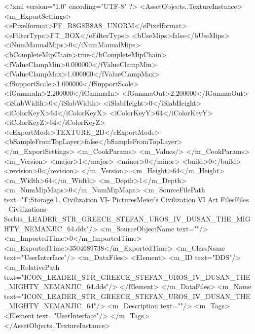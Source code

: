 <?xml version="1.0" encoding="UTF-8" ?>
<AssetObjects..TextureInstance>
	<m_ExportSettings>
		<ePixelformat>PF_R8G8B8A8_UNORM</ePixelformat>
		<eFilterType>FT_BOX</eFilterType>
		<bUseMips>false</bUseMips>
		<iNumManualMips>0</iNumManualMips>
		<bCompleteMipChain>true</bCompleteMipChain>
		<fValueClampMin>0.000000</fValueClampMin>
		<fValueClampMax>1.000000</fValueClampMax>
		<fSupportScale>1.000000</fSupportScale>
		<fGammaIn>2.200000</fGammaIn>
		<fGammaOut>2.200000</fGammaOut>
		<iSlabWidth>0</iSlabWidth>
		<iSlabHeight>0</iSlabHeight>
		<iColorKeyX>64</iColorKeyX>
		<iColorKeyY>64</iColorKeyY>
		<iColorKeyZ>64</iColorKeyZ>
		<eExportMode>TEXTURE_2D</eExportMode>
		<bSampleFromTopLayer>false</bSampleFromTopLayer>
	</m_ExportSettings>
	<m_CookParams>
		<m_Values/>
	</m_CookParams>
	<m_Version>
		<major>1</major>
		<minor>0</minor>
		<build>0</build>
		<revision>0</revision>
	</m_Version>
	<m_Height>64</m_Height>
	<m_Width>64</m_Width>
	<m_Depth>1</m_Depth>
	<m_NumMipMaps>0</m_NumMipMaps>
	<m_SourceFilePath text="F:\Mod Storage\2.1. Civilization VI\Mods\Archive - Pictures\Sid Meier's Civilization VI Art Files\Art Files - Civilizations\Civilization - Serbia\ICON_LEADER_STR_GREECE_STEFAN_UROS_IV_DUSAN_THE_MIGHTY_NEMANJIC_64.dds"/>
	<m_SourceObjectName text=""/>
	<m_ImportedTime>0</m_ImportedTime>
	<m_ExportedTime>3504689738</m_ExportedTime>
	<m_ClassName text="UserInterface"/>
	<m_DataFiles>
		<Element>
			<m_ID text="DDS"/>
			<m_RelativePath text="ICON_LEADER_STR_GREECE_STEFAN_UROS_IV_DUSAN_THE_MIGHTY_NEMANJIC_64.dds"/>
		</Element>
	</m_DataFiles>
	<m_Name text="ICON_LEADER_STR_GREECE_STEFAN_UROS_IV_DUSAN_THE_MIGHTY_NEMANJIC_64"/>
	<m_Description text=""/>
	<m_Tags>
		<Element text="UserInterface"/>
	</m_Tags>
</AssetObjects..TextureInstance>

